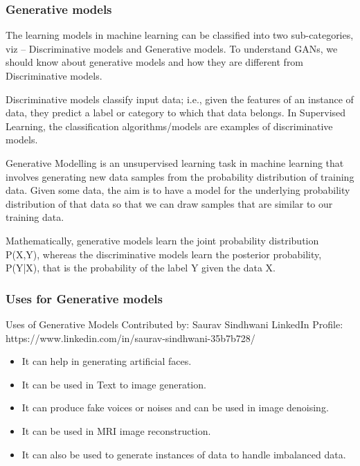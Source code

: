 \subsubsection{Generative models}

The learning models in machine learning can be classified into two sub-categories, viz – Discriminative models and Generative models. To understand GANs, we should know about generative models and how they are different from Discriminative models.

Discriminative models classify input data; i.e., given the features of an instance of data, they predict a label or category to which that data belongs. In Supervised Learning, the classification algorithms/models are examples of discriminative models.

Generative Modelling is an unsupervised learning task in machine learning that involves generating new data samples from the probability distribution of training data. Given some data, the aim is to have a model for the underlying probability distribution of that data so that we can draw samples that are similar to our training data.

Mathematically, generative models learn the joint probability distribution P(X,Y), whereas the discriminative models learn the posterior probability, P(Y|X), that is the probability of the label Y given the data X.

\subsubsection{Uses for Generative models}

Uses of Generative Models
Contributed by: Saurav Sindhwani
LinkedIn Profile: https://www.linkedin.com/in/saurav-sindhwani-35b7b728/

\begin{itemize}
	\item It can help in generating artificial faces.
	\item It can be used in Text to image generation.
	\item It can produce fake voices or noises and can be used in image denoising.
	\item It can be used in MRI image reconstruction.
	\item It can also be used to generate instances of data to handle imbalanced data.
\end{itemize}

